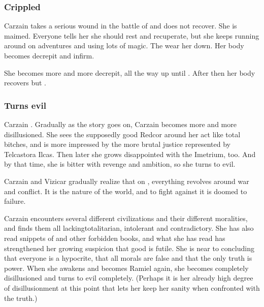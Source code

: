 \subsubsection{Crippled}
Carzain takes a serious wound in the battle of \Forclin and does not recover. 
She is maimed.
Everyone tells her she should rest and recuperate, but she keeps running around on adventures and using lots of magic. 
The \qliphoth wear her down.
Her body becomes decrepit and infirm.

She becomes more and more decrepit, all the way up until . 
After then her body recovers but .





\subsubsection{Turns evil}
Carzain . 
Gradually as the story goes on, Carzain becomes more and more disillusioned. 
She sees the supposedly good Redcor around her act like total bitches, and is more impressed by the more brutal justice represented by Telcastora Ilcas. 
Then later she grows disappointed with the Imetrium, too. And by that time, she is bitter with revenge and ambition, so she turns to evil. 

Carzain and Vizicar gradually realize that on \Miith{}, everything revolves around war and conflict. It is the nature of the world, and to fight against it is doomed to failure. 

Carzain encounters several different civilizations and their different moralities, and finds them all lacking\dash{}totalitarian, intolerant and contradictory. 
She has also read snippets of \WanderersInDarknessEmph and other forbidden books, and what she has read has strengthened her growing suspicion that good is futile. 
She is near to concluding that everyone is a hypocrite, that all morals are false and that the only truth is power. 
When she awakens and becomes Ramiel again, she becomes completely disillusioned and turns to evil completely. 
(Perhaps it is her already high degree of disillusionment at this point that lets her keep her sanity when confronted with the truth.) 











